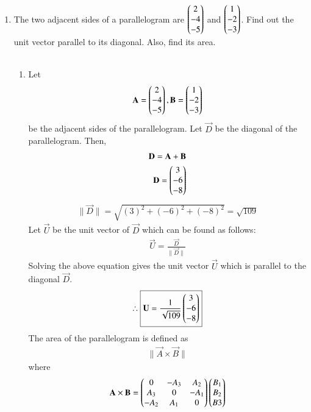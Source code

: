 \documentclass[journal,12pt,twocolumn]{IEEEtran}
\renewcommand\thesection{\arabic{section}}
\begin{document}
\begin{enumerate}[label=\thesection.\arabic*.,ref=\thesection.\theenumi]
\item The two adjacent sides of a parallelogram are $\begin{pmatrix}2\\-4\\-5\end{pmatrix}$ and $\begin{pmatrix}1\\-2\\-3\end{pmatrix}$. Find out the unit vector parallel to its diagonal. Also, find its area.\\\\
\solution\begin{enumerate}
    \item Let 
    \begin{align}
        \mathbf{A}=\begin{pmatrix}2\\-4\\-5\end{pmatrix}, \mathbf{B}=\begin{pmatrix}1\\-2\\-3\end{pmatrix}
    \end{align}
    be the adjacent sides of the parallelogram. Let $\vec{D}$ be the diagonal of the parallelogram. Then,
    \begin{align}
        \mathbf{D}=\mathbf{A}+\mathbf{B}\\
        \mathbf{D}=\begin{pmatrix}3\\-6\\-8\end{pmatrix}
    \end{align}
   \begin{align}
       \|\vec{D}\|=\sqrt{(3)^2+(-6)^2+(-8)^2}=\sqrt{109}
   \end{align}
   Let $\vec{U}$ be the unit vector of $\vec{D}$ which can be found as follows:
   \begin{align}
       \vec{U}=\frac{\vec{D}}{\|\vec{D}\|}
   \end{align}
   Solving the above equation gives the unit vector $\vec{U}$ which is parallel to the diagonal $\vec{D}$.\\
   \begin{align}\therefore
       \boxed
       {\mathbf{U}=\frac{1}{\sqrt{109}}\begin{pmatrix}3\\-6\\-8\end{pmatrix}}
   \end{align}
   The area of the parallelogram is defined as
   \begin{align}
       \|\vec{A}\times\vec{B}\|
   \end{align}
   where
   \begin{align}
       \vec{A}\times\vec{B}=\myvec{0&-A_3&A_2\\A_3&0&-A_1\\-A_2&A_1&0}\myvec{B_1\\B_2\\B3}\\

\end{align}
\end{enumerate}
\end{enumerate}
\end{document}
